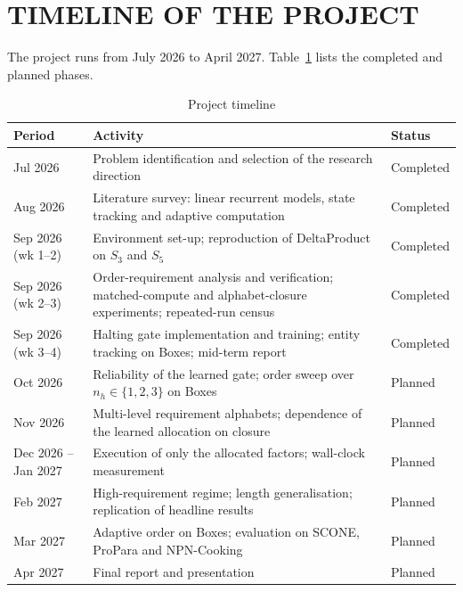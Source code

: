 \clearpage
\chapter*{TIMELINE OF THE PROJECT}
\setcounter{section}{0}\renewcommand{\thesection}{T}\setcounter{table}{0}\renewcommand{\thetable}{T.1}
The project runs from July 2026 to April 2027. Table~\ref{tab:timeline} lists the completed and planned phases.

\begin{table}[ht]
	\caption{Project timeline}
	\centering
	\small
	\begin{tabular}{>{\raggedright\arraybackslash}p{3.4cm} >{\raggedright\arraybackslash}p{8.2cm} p{1.8cm}}
		\toprule
		\textbf{Period} & \textbf{Activity} & \textbf{Status} \\
		\midrule
		Jul 2026 & Problem identification and selection of the research direction & Completed \\
		Aug 2026 & Literature survey: linear recurrent models, state tracking and adaptive computation & Completed \\
		Sep 2026 (wk 1--2) & Environment set-up; reproduction of DeltaProduct on $S_3$ and $S_5$ & Completed \\
		Sep 2026 (wk 2--3) & Order-requirement analysis and verification; matched-compute and alphabet-closure experiments; repeated-run census & Completed \\
		Sep 2026 (wk 3--4) & Halting gate implementation and training; entity tracking on Boxes; mid-term report & Completed \\
		\midrule
		Oct 2026 & Reliability of the learned gate; order sweep over $n_h \in \{1,2,3\}$ on Boxes & Planned \\
		Nov 2026 & Multi-level requirement alphabets; dependence of the learned allocation on closure & Planned \\
		Dec 2026 -- Jan 2027 & Execution of only the allocated factors; wall-clock measurement & Planned \\
		Feb 2027 & High-requirement regime; length generalisation; replication of headline results & Planned \\
		Mar 2027 & Adaptive order on Boxes; evaluation on SCONE, ProPara and NPN-Cooking & Planned \\
		Apr 2027 & Final report and presentation & Planned \\
		\bottomrule
	\end{tabular}
	\label{tab:timeline}
\end{table}
